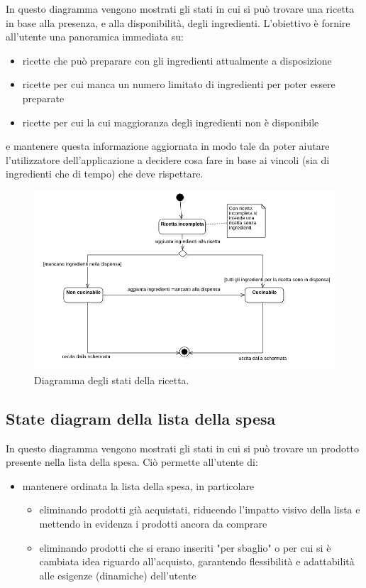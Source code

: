 In questo diagramma vengono mostrati gli stati in cui si può trovare una ricetta in base alla presenza, e alla disponibilità, degli ingredienti.
L'obiettivo è fornire all'utente una panoramica immediata su:
\begin{itemize}
    \item ricette che può preparare con gli ingredienti attualmente a disposizione
    \item ricette per cui manca un numero limitato di ingredienti per poter essere preparate
    \item ricette per cui la cui maggioranza degli ingredienti non è disponibile
\end{itemize}
e mantenere questa informazione aggiornata in modo tale da poter aiutare l'utilizzatore dell'applicazione a decidere cosa fare in base ai vincoli (sia di ingredienti che di tempo) che deve rispettare.
\begin{figure}[H]
    \includegraphics[width=\linewidth]{images/state-recipe.png}
    \caption{Diagramma degli stati della ricetta.}
    \label{fig:staterecipe}
\end{figure}

\newpage

\subsection{State diagram della lista della spesa}

In questo diagramma vengono mostrati gli stati in cui si può trovare un prodotto presente nella lista della spesa.
Ciò permette all'utente di:
\begin{itemize}
    \item mantenere ordinata la lista della spesa, in particolare
    \begin{itemize}
        \item eliminando prodotti già acquistati, riducendo l'impatto visivo della lista e mettendo in evidenza i prodotti ancora da comprare
        \item eliminando prodotti che si erano inseriti "per sbaglio" o per cui si è cambiata idea riguardo all'acquisto, garantendo flessibilità e adattabilità alle esigenze (dinamiche) dell'utente
    \end{itemize}
\end{itemize}


